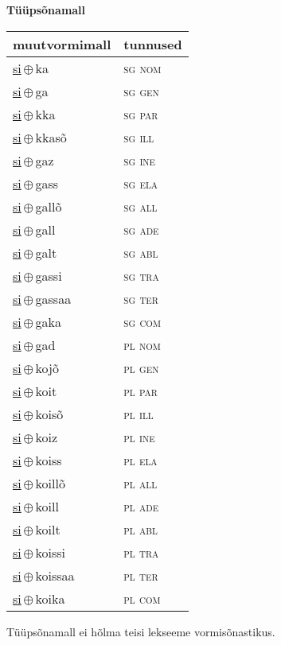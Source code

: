 

\vspace{3.5em}
\noindent \begin{minipage}{\textwidth}
\noindent \textbf{Tüüpsõnamall \,}\\

\begin{sideways}
\begin{tabular}{l l}
muutvormimall & tunnused \\
\hline
\underline{si}\,$\oplus$\,ka & \textsc{ sg nom } \\
\underline{si}\,$\oplus$\,ga & \textsc{ sg gen } \\
\underline{si}\,$\oplus$\,kka & \textsc{ sg par } \\
\underline{si}\,$\oplus$\,kkasõ & \textsc{ sg ill } \\
\underline{si}\,$\oplus$\,gaz & \textsc{ sg ine } \\
\underline{si}\,$\oplus$\,gass & \textsc{ sg ela } \\
\underline{si}\,$\oplus$\,gallõ & \textsc{ sg all } \\
\underline{si}\,$\oplus$\,gall & \textsc{ sg ade } \\
\underline{si}\,$\oplus$\,galt & \textsc{ sg abl } \\
\underline{si}\,$\oplus$\,gassi & \textsc{ sg tra } \\
\underline{si}\,$\oplus$\,gassaa & \textsc{ sg ter } \\
\underline{si}\,$\oplus$\,gaka & \textsc{ sg com } \\
\underline{si}\,$\oplus$\,gad & \textsc{ pl nom } \\
\underline{si}\,$\oplus$\,kojõ & \textsc{ pl gen } \\
\underline{si}\,$\oplus$\,koit & \textsc{ pl par } \\
\underline{si}\,$\oplus$\,koisõ & \textsc{ pl ill } \\
\underline{si}\,$\oplus$\,koiz & \textsc{ pl ine } \\
\underline{si}\,$\oplus$\,koiss & \textsc{ pl ela } \\
\underline{si}\,$\oplus$\,koillõ & \textsc{ pl all } \\
\underline{si}\,$\oplus$\,koill & \textsc{ pl ade } \\
\underline{si}\,$\oplus$\,koilt & \textsc{ pl abl } \\
\underline{si}\,$\oplus$\,koissi & \textsc{ pl tra } \\
\underline{si}\,$\oplus$\,koissaa & \textsc{ pl ter } \\
\underline{si}\,$\oplus$\,koika & \textsc{ pl com } \\
\end{tabular}
\end{sideways}
\label{tab:tüüpsõnamall-sika}

\end{minipage}

 
\vspace{1em}
\noindent Tüüpsõnamall  ei hõlma teisi lekseeme vormi\-sõnastikus.
